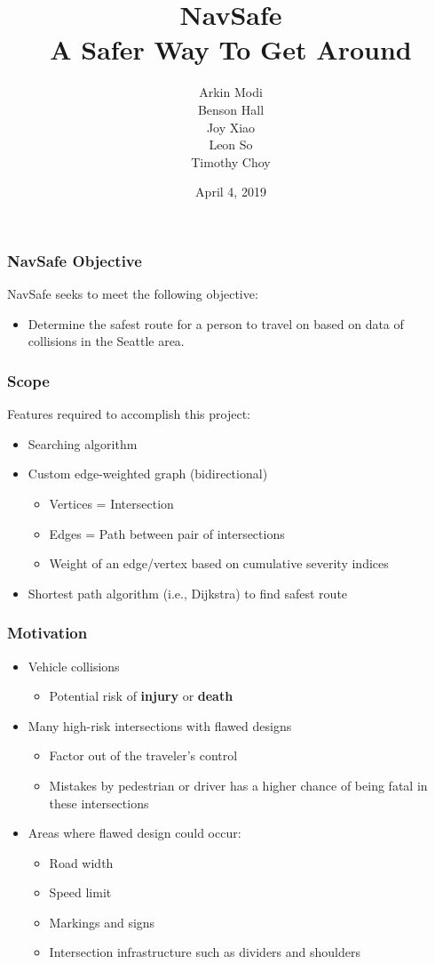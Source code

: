 \documentclass[t,12pt,numbers,fleqn]{beamer}
\title{
    NavSafe\\
    \large A Safer Way To Get Around
}
\author{
    Arkin Modi\\
    Benson Hall\\
    Joy Xiao\\
    Leon So\\
    Timothy Choy
}
\institute{Department of Software and Computing, McMaster University}
\date{April 4, 2019}
\begin{document}
 
\frame{\titlepage}


\begin{frame}
\frametitle{NavSafe Objective}
NavSafe seeks to meet the following objective:
\begin{itemize}
    \item Determine the safest route for a person to travel on based on data of collisions in the Seattle area.
\end{itemize}
\end{frame}
 
\begin{frame}
\frametitle{Scope}
Features required to accomplish this project:
\begin{itemize}
    \item Searching algorithm
    \item Custom edge-weighted graph (bidirectional)
    \begin{itemize}
        \item[] Vertices = Intersection
        \item[] Edges = Path between pair of intersections
        \item[] Weight of an edge/vertex based on cumulative severity indices 
    \end{itemize}
    \item Shortest path algorithm (i.e., Dijkstra) to find safest route
\end{itemize}

\end{frame}
\begin{frame}
\frametitle{Motivation}
\begin{itemize}
    \item Vehicle collisions
    \begin{itemize}
        \item Potential risk of \textbf{injury} or \textbf{death}
    \end{itemize}
    \item Many high-risk intersections with flawed designs
    \begin{itemize}
        \item Factor out of the traveler’s control
        \item Mistakes by pedestrian or driver has a higher chance of being fatal in these intersections
    \end{itemize}
    \item Areas where flawed design could occur:
    \begin{itemize}
        \item Road width
        \item Speed limit
        \item Markings and signs
        \item Intersection infrastructure such as dividers and shoulders
    \end{itemize}
\end{itemize}
\end{frame}
\end{document}
